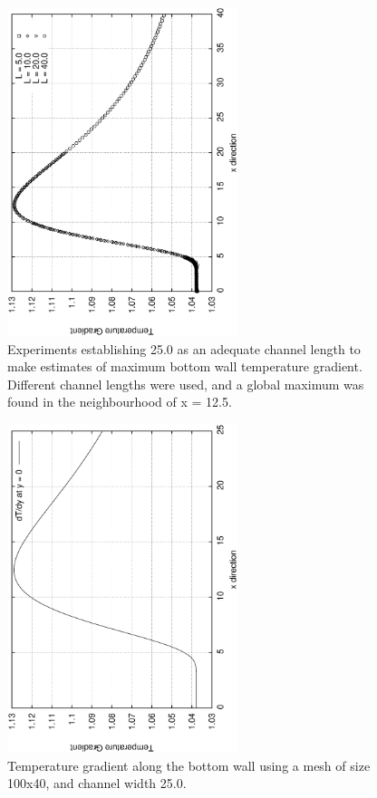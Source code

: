 \documentclass[a4paper,10pt]{article}
\begin{document}
\begin{enumerate}[I]
\begin{figure}
  \centering
  \includegraphics[width=0.6\textwidth, angle = -90]{../plots/size/size.eps}
  \caption{Experiments establishing 25.0 as an adequate channel length to make estimates of maximum bottom wall temperature gradient. Different channel lengths were used, and a global maximum was found in the neighbourhood of x = 12.5.}                
  \label{size}
\end{figure}

\begin{figure}
  \centering
  \includegraphics[width=0.6\textwidth, angle = -90]{../plots/gradient/gradient.eps}
  \caption{Temperature gradient along the bottom wall using a mesh of size 100x40, and channel width 25.0.}                
  \label{gradient}
\end{figure}


\end{enumerate}
\end{document}
